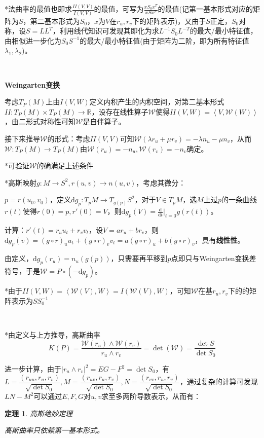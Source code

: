 \documentclass[a4paper,UTF8,fontset=windows]{ctexart}
\newtheorem{thm}{定理}[section]
\begin{document}
*法曲率的最值也即求$\frac{II(V,V)}{I(V,V)}$的最值，可写为$\frac{xS_0x^T}{xSx^T}$的最值(记第一基本形式对应的矩阵为$S$，第二基本形式为$S_0$，$x$为$V$在$r_u,r_v$下的矩阵表示)，又由于$S$正定，$S_0$对称，设$S=LL^T$，利用线代知识可发现其即化为求$L^{-1}S_0L^{-T}$的最大/最小特征值，由相似进一步化为$S_0S^{-1}$的最大/最小特征值(由于矩阵为二阶，即为所有特征值$\lambda_1,\lambda_2$)。

\

\textbf{Weingarten变换}

考虑$T_P(M)$上由$I(V,W)$定义内积产生的内积空间，对第二基本形式$II:T_P(M)\times T_P(M)\to\mathbb{R}$，设存在线性算子$\mathcal{W}$使得$II(V,W)=\left<V,\mathcal{W}(W)\right>$，由二形式对称性可知$\mathcal{W}$是自伴算子。

接下来推导$\mathcal{W}$的形式：考虑$II(V,V)$可知$\mathcal{W}(\lambda r_u+\mu r_v)=-\lambda n_u-\mu n_v$，从而$\mathcal{W}:T_P(M)\to T_P(M)$由$\mathcal{W}(r_u)=-n_u,\mathcal{W}(r_v)=-n_v$确定。

*可验证$\mathcal{W}$的确满足上述条件

*高斯映射$g:M\to S^2,r(u,v)\to n(u,v)$，考虑其微分：

$p=r(u_0,v_0)$，定义$\mathrm{d}g_p:T_pM\to T_{g(p)}S^2$，对于$V\in T_pM$，选$M$上过$p$的一条曲线$r(t)$使得$r(0)=p,r'(0)=V$，则$\mathrm{d}g_p(V)=\frac{\mathrm{d}}{\mathrm{d}t}\big|_{t=0}g(r(t))$。

计算：$r'(t)=r_uu_t+r_vv_t$，设$V=ar_u+br_v$，则$\mathrm{d}g_p(v)=(g\circ r)_uu_t+(g\circ r)_vv_t=a(g\circ r)_u+b(g\circ r)_v$，具有\textbf{线性性}。

由定义，$\mathrm{d}g_p(r_u)=n_u(g(p))$，只需要再平移到$p$点即只与Weingarten变换差符号，于是$\mathcal{W}=P\circ(-\mathrm{d}g_p)$。

*由于$II(V,W)=\left<\mathcal{W}(V),W\right>=I(\mathcal{W}(V),W)$，可知$\mathcal{W}$在基$r_u,r_v$下的的矩阵表示为$SS_0^{-1}$

\

*由定义与上方推导，高斯曲率
$$K(P)=\frac{\mathcal{W}(r_u)\wedge\mathcal{W}(r_v)}{r_u\wedge r_v}=\det(\mathcal{W})=\frac{\det S}{\det S_0}$$

进一步计算，由于$|r_u\wedge r_v|^2=EG-F^2=\det S_0$，有$L=\dfrac{(r_{uu},r_u,r_v)}{\sqrt{\det S_0}},M=\dfrac{(r_{uv},r_u,r_v)}{\sqrt{\det S_0}},N=\dfrac{(r_{vv},r_u,r_v)}{\sqrt{\det S_0}}$，通过复杂的计算可发现$LN-M^2$可以通过$E,F,G$对$u,v$求至多两阶导数表示，从而有：

\begin{thm} 高斯绝妙定理

高斯曲率只依赖第一基本形式。
\end{thm}
\end{document}
